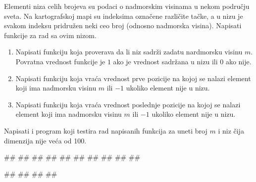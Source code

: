 \ifresenja
\begin{Answer}[ref=v.nizovi_funkcije_intro]
\end{Answer}
\fi

\begin{Exercise}[label=v.nizovi_funkcije_razno] 
Elementi niza celih brojeva su podaci o nadmorskim visinama u nekom
području sveta.  Na kartografskoj mapi su indeksima označene različite
tačke, a u nizu je svakom indeksu pridružen neki ceo broj (odnosno
nadmorska visina). Napisati funkcije za rad sa ovim nizom.
\begin{enumerate}
\item Napisati funkciju koja proverava da li niz sadrži zadatu
  nardmorsku visinu $m$. Povratna vrednost funkcije je $1$ ako je
  vrednost sadržana u nizu ili $0$ ako nije.
\item Napisati funkciju koja vraća vrednost prve pozicije na kojoj se
  nalazi element koji ima nadmorsku visinu $m$ ili $-1$ ukoliko
  element nije u nizu.
\item Napisati funkciju koja vraća vrednost poslednje pozicije na
  kojoj se nalazi element koji ima nadmorsku visinu $m$ ili $-1$
  ukoliko element nije u nizu.
\end{enumerate}
Napisati i program koji testira rad napisanih funkcija za uneti broj
$m$ i niz čija dimenzija nije veća od 100.

\begin{maxitest}
\begin{upotreba}{1}
#\naslovInt#
##
##
##
##
##
##
##
##
##
\end{upotreba}
\end{maxitest}

\begin{miditest}
\begin{upotreba}{2}
#\naslovInt#
##
##
##
\end{upotreba}
\end{miditest}
\end{Exercise}

